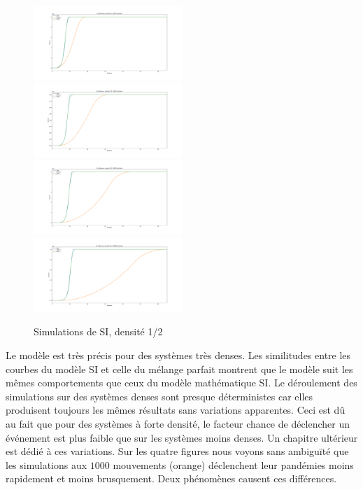 \begin{figure}
    \centering
    \captionsetup{justification=centering}
    \includegraphics[width=0.5\textwidth]{Images/SI_ref_2_5k.pdf}
    \includegraphics[width=0.5\textwidth]{Images/SI_ref_2_20k.pdf}
    \includegraphics[width=0.5\textwidth]{Images/SI_ref_2_50k.pdf}
    \includegraphics[width=0.5\textwidth]{Images/SI_ref_2_100k.pdf}
    \caption{Simulations de SI, densité 1/2}
\end{figure}

Le modèle est très précis pour des systèmes très denses. Les similitudes entre les courbes du modèle SI et celle du mélange parfait montrent que le modèle suit les mêmes comportements que ceux du modèle mathématique SI. Le déroulement des simulations sur des systèmes denses sont presque déterministes car elles produisent toujours les mêmes résultats sans variations apparentes. Ceci est dû au fait que pour des systèmes à forte densité, le facteur chance de déclencher un événement est plus faible que sur les systèmes moins denses. Un chapitre ultérieur est dédié à ces variations. Sur les quatre figures nous voyons sans ambiguïté que les simulations aux $1000$ mouvements (orange) déclenchent leur pandémies moins rapidement et moins brusquement. Deux phénomènes causent ces différences. \\

